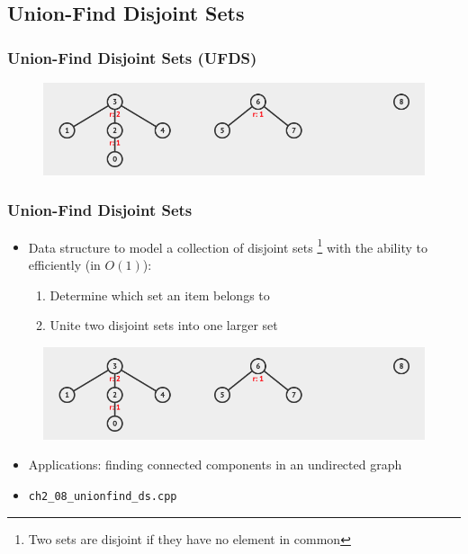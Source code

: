 \documentclass{beamer}
\begin{document}
\subsection{Union-Find Disjoint Sets}

\begin{frame}
\frametitle{Union-Find Disjoint Sets (UFDS)}
	\begin{figure}
	    \centering
	    \includegraphics[scale=0.38]{imgs/2.4/ufds/ufds.png}
	\end{figure}
\end{frame}

\begin{frame}[fragile]
\frametitle{Union-Find Disjoint Sets}
	\begin{itemize}
	    \item Data structure to model a collection of disjoint sets \footnote{Two sets are disjoint if they have no element in common} with the ability to efficiently (in $O(1)$):
	    	\begin{enumerate}
			    \item Determine which set an item belongs to
			    \item Unite two disjoint sets into one larger set
			\end{enumerate}
	\end{itemize}
	\begin{figure}
	    \centering
	    \includegraphics[scale=0.2]{imgs/2.4/ufds/ufds.png}
	\end{figure}
	\begin{itemize}		
		\item Applications: finding connected components in an undirected graph
		\item \color{red}\verb|ch2_08_unionfind_ds.cpp|\color{black}
	\end{itemize}
\end{frame}
\end{document}
